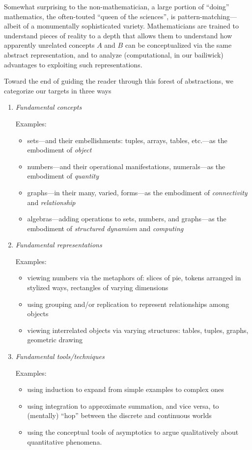 Somewhat surprising to the non-mathematician, a large portion of
``doing'' mathematics, the often-touted ``queen of the sciences'', is
pattern-matching---albeit of a monumentally sophisticated variety.
Mathematicians are trained to understand pieces of reality to a depth
that allows them to understand how apparently unrelated concepts $A$
and $B$ can be conceptualized via the same abstract representation,
and to analyze (computational, in our bailiwick) advantages to
exploiting such representations.

Toward the end of guiding the reader through this forest of
abstractions, we categorize our targets in three ways
\begin{enumerate}
\item
{\it Fundamental concepts}

{\sf Examples:}
\begin{itemize}
\item
sets---and their embellishments: tuples, arrays, tables, etc.---as the
embodiment of {\it object}
\item
numbers---and their operational manifestations, numerals---as the
embodiment of {\it quantity}
\item
graphs---in their many, varied, forms---as the embodiment of {\it
  connectivity} and {\it relationship}
\item
algebras---adding operations to sets, numbers, and graphs---as the
embodiment of {\it structured dynamism} and {\it computing}
\end{itemize}

\item
{\it Fundamental representations}

{\sf Examples:}
\begin{itemize}
\item
viewing numbers via the metaphors of: slices of pie, tokens arranged in
stylized ways, rectangles of varying dimensions
\item
using grouping and/or replication to represent relationships among
objects
\item
viewing interrelated objects via varying structures: tables, tuples,
graphs, geometric drawing
\end{itemize}

\item
{\it Fundamental tools/techniques}

{\sf Examples:}
\begin{itemize}
\item
using induction to expand from simple examples to complex ones
\item
using integration to approximate summation, and vice versa, to
(mentally) ``hop'' between the discrete and continuous worlds
\item
using the conceptual tools of asymptotics to argue qualitatively about
quantitative phenomena.
\end{itemize}
\end{enumerate}

